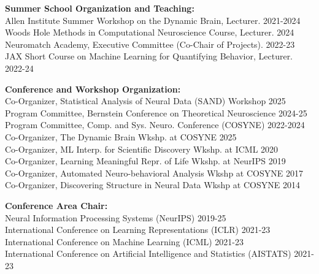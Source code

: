 \documentclass[10pt]{article}
\begin{document}
\begin{outerlist}

\item \textbf{Summer School Organization and Teaching:} \\
  Allen Institute Summer Workshop on the Dynamic Brain, Lecturer. \hfill{\small 2021-2024}\\
  Woods Hole Methods in Computational Neuroscience Course, Lecturer. \hfill{\small 2024}\\
  Neuromatch Academy, Executive Committee (Co-Chair of Projects). \hfill{\small 2022-23} \\
  JAX Short Course on Machine Learning for Quantifying Behavior, Lecturer. \hfill {\small 2022-24}\\
  
\item \textbf{Conference and Workshop Organization:} \\
  Co-Organizer, Statistical Analysis of Neural Data (SAND) Workshop \hfill{\small 2025} \\
  Program Committee, Bernstein Conference on Theoretical Neuroscience \hfill{\small 2024-25} \\
  Program Committee, Comp. and Sys. Neuro. Conference (COSYNE) \hfill{\small 2022-2024} \\
  Co-Organizer, The Dynamic Brain Wkshp. at COSYNE \hfill{\small 2025} \\
  Co-Organizer, ML Interp. for Scientific Discovery Wkshp. at ICML \hfill{\small 2020}\\
  Co-Organizer, Learning Meaningful Repr. of Life Wkshp. at NeurIPS \hfill{\small 2019}\\
  Co-Organizer, Automated Neuro-behavioral Analysis Wkshp at COSYNE \hfill{\small 2017}\\
  Co-Organizer, Discovering Structure in Neural Data Wkshp at COSYNE \hfill{\small 2014}

\item \textbf{Conference Area Chair:} \\
  Neural Information Processing Systems (NeurIPS) \hfill{\small 2019-25}\\
  International Conference on Learning Representations (ICLR) \hfill{\small 2021-23}\\
  International Conference on Machine Learning (ICML) \hfill{\small 2021-23}\\
  International Conference on Artificial Intelligence and Statistics (AISTATS) \hfill{\small 2021-23}
  

\end{outerlist}
\end{document}
